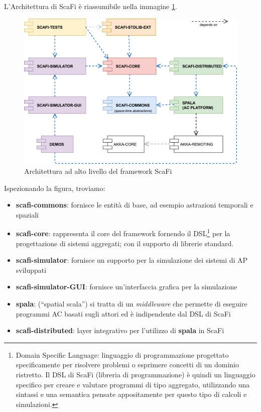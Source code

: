 \documentclass[12pt,a4paper,openright,twoside]{book}
\begin{document}
L'Architettura di ScaFi \cite{Casadei2022} è riassumibile nella immagine \cref{fig:scafi-arc}.

\begin{figure}
    \centering
    \includegraphics[width=.8\linewidth]{figures/scafi-arc.jpg}
    \caption{Architettura ad alto livello del framework ScaFi}
    \label{fig:scafi-arc}
\end{figure}

Ispezionando la figura, troviamo:

\begin{itemize}
    \item \textbf{scafi-commons}: fornisce le entità di base, ad esempio astrazioni temporali e spaziali
    \item \textbf{scafi-core}: rappresenta il core del framework fornendo il DSL\footnote{Domain Specific Language: linguaggio di programmazione progettato specificamente per risolvere problemi o esprimere concetti di un dominio ristretto. Il DSL di ScaFi (libreria di programmazione) è quindi un linguaggio specifico per creare e valutare programmi di tipo aggregato, utilizzando una sintassi e una semantica pensate appositamente per questo tipo di calcoli e simulazioni.} per la progettazione di sistemi aggregati; con il supporto di librerie standard.
    \item \textbf{scafi-simulator}: fornisce un supporto per la simulazione dei sistemi di \ac{AP} sviluppati
    \item \textbf{scafi-simulator-GUI}: fornisce un'interfaccia grafica per la simulazione
    \item \textbf{spala}: (``spatial scala'') si tratta di un \textit{middleware} che permette di eseguire programmi \ac{AC} basati sugli attori ed è indipendente dal DSL di ScaFi
    \item \textbf{scafi-distributed}: layer integrativo per l'utilizzo di \textbf{spala} in ScaFi
\end{itemize}
\end{document}
